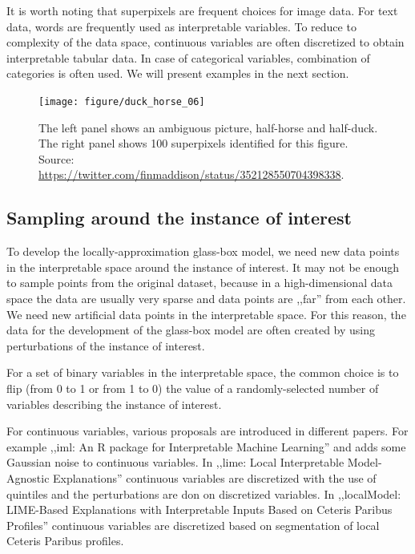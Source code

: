 \documentclass[]{krantz}
\begin{document}
It is worth noting that superpixels are frequent choices for image data. For text data, words are frequently used as interpretable variables. To reduce to complexity of the data space, continuous variables are often discretized to obtain interpretable tabular data. In case of categorical variables, combination of categories is often used. We will present examples in the next section.



\begin{figure}

{\centering \texttt{[image: figure/duck\_horse\_06]} 

}

\caption{The left panel shows an ambiguous picture, half-horse and half-duck. The right panel shows 100 superpixels identified for this figure. Source: \url{https://twitter.com/finmaddison/status/352128550704398338}.}\label{fig:duckHorse06}
\end{figure}

\hypertarget{sampling-around-the-instance-of-interest}{%
\subsection{Sampling around the instance of interest}\label{sampling-around-the-instance-of-interest}}

To develop the locally-approximation glass-box model, we need new data points in the interpretable space around the instance of interest. It may not be enough to sample points from the original dataset, because in a high-dimensional data space the data are usually very sparse and data points are ,,far'' from each other. We need new artificial data points in the interpretable space. For this reason, the data for the development of the glass-box model are often created by using perturbations of the instance of interest.

For a set of binary variables in the interpretable space, the common choice is to flip (from 0 to 1 or from 1 to 0) the value of a randomly-selected number of variables describing the instance of interest.

For continuous variables, various proposals are introduced in different papers. For example ,,iml: An R package for Interpretable Machine Learning'' \citep{imlRPackage} and \citep{molnar2019} adds some Gaussian noise to continuous variables. In ,,lime: Local Interpretable Model-Agnostic Explanations'' \citep{limePackage} continuous variables are discretized with the use of quintiles and the perturbations are don on discretized variables. In ,,localModel: LIME-Based Explanations with Interpretable Inputs Based on Ceteris Paribus Profiles'' \citep{localModelPackage} continuous variables are discretized based on segmentation of local Ceteris Paribus profiles.
\end{document}
